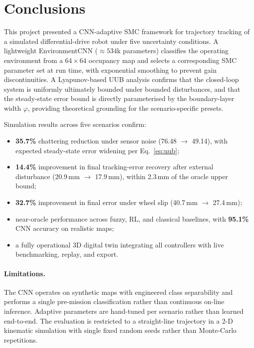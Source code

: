 \documentclass[11pt,a4paper]{article}
\begin{document}
\clearpage
\section{Conclusions}

This project presented a CNN-adaptive SMC framework for trajectory tracking of a simulated
differential-drive robot under five uncertainty conditions. A lightweight EnvironmentCNN
(${\approx}534$k parameters) classifies the operating environment from a $64{\times}64$
occupancy map and selects a corresponding SMC parameter set at run time, with exponential
smoothing to prevent gain discontinuities. A Lyapunov-based UUB analysis confirms that the
closed-loop system is uniformly ultimately bounded under bounded disturbances, and that
the steady-state error bound is directly parameterised by the boundary-layer width
$\varphi$, providing theoretical grounding for the scenario-specific presets.

Simulation results across five scenarios confirm:
\begin{itemize}
    \item \textbf{35.7\%} chattering reduction under sensor noise (76.48 $\to$ 49.14),
          with expected steady-state error widening per Eq.~\eqref{eq:uub};
    \item \textbf{14.4\%} improvement in final tracking-error recovery after external
          disturbance (20.9\,mm $\to$ 17.9\,mm), within 2.3\,mm of the oracle upper bound;
    \item \textbf{32.7\%} improvement in final error under wheel slip
          (40.7\,mm $\to$ 27.4\,mm);
    \item near-oracle performance across fuzzy, RL, and classical baselines, with
          \textbf{95.1\%} CNN accuracy on realistic maps;
    \item a fully operational 3D digital twin integrating all controllers with live
          benchmarking, replay, and export.
\end{itemize}

\paragraph{Limitations.}
The CNN operates on synthetic maps with engineered class separability and performs a
single pre-mission classification rather than continuous on-line inference. Adaptive
parameters are hand-tuned per scenario rather than learned end-to-end. The evaluation is
restricted to a straight-line trajectory in a 2-D kinematic simulation with single fixed
random seeds rather than Monte-Carlo repetitions.
\end{document}
